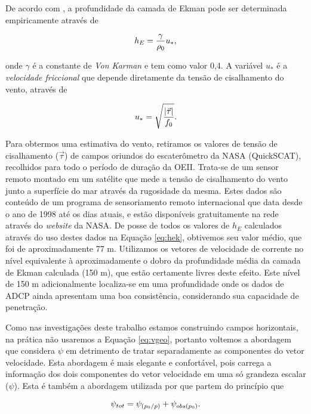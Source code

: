 De acordo com \cite{cushman1994}, a profundidade da camada de Ekman pode ser determinada empiricamente 
através de 

\begin{equation}
h_E = \frac{\gamma}{\rho_0}u_*, 
\vspace{0.5cm}
\label{eq:hek}
\end{equation}

onde $\gamma$ é a constante de {\it Von Karman} e tem como valor 0,4. A variável $u_*$ é a {\it velocidade
friccional} que depende diretamente da tensão de cisalhamento do vento, através de

\begin{equation}
u_* = \sqrt{\frac{| \vec{\tau} |}{f_0}}.
\vspace{0.5cm}
\label{eq:ufric}
\end{equation}
  
Para obtermos uma estimativa do vento, retiramos os valores de tensão de cisalhamento ($\vec{\tau}$)
de campos oriundos do escaterômetro da NASA (QuickSCAT), recolhidos
para todo o período de duração da OEII. Trata-se de um sensor remoto montado em um satélite que mede
a tensão de cisalhamento do vento junto a superfície do mar através da rugosidade da mesma. Estes dados 
são conteúdo de um programa de sensoriamento remoto internacional que data desde o ano de 1998 até os dias atuais, 
e estão disponíveis gratuitamente na rede através do {\it website} da NASA. 
De posse de todos os valores de $h_E$ calculados através do uso destes dados na Equação \ref{eq:hek}, 
obtivemos seu valor médio, que foi de aproximadamente 77 m. Utilizamos os vetores de velocidade de corrente no nível
equivalente à aproximadamente o dobro da profundidade média da camada de Ekman calculada (150 m),
que estão certamente livres deste efeito.
Este nível de 150 m adicionalmente localiza-se em uma profundidade onde os dados de ADCP
ainda apresentam uma boa consistência, considerando sua 
capacidade de penetração.

Como nas investigações deste trabalho estamos construindo campos horizontais, na prática não usaremos a Equação 
\ref{eq:vgeo}, portanto voltemos a abordagem que 
considera $\psi$ em detrimento de tratar separadamente as componentes do vetor velocidade. Esta abordagem é 
mais elegante e confortável, pois carrega a informação dos dois componentes do vetor velocidade em uma só
grandeza escalar ($\psi$). Esta é também a abordagem utilizada por \cite{sutton_chereskin2002} que partem
do princípio que 

\begin{equation}
\psi_{tot} = \psi_{(p_0/p)} + \psi_{obs(p_0)}.
\vspace{0.5cm}
\label{eq:psiref}
\end{equation}

